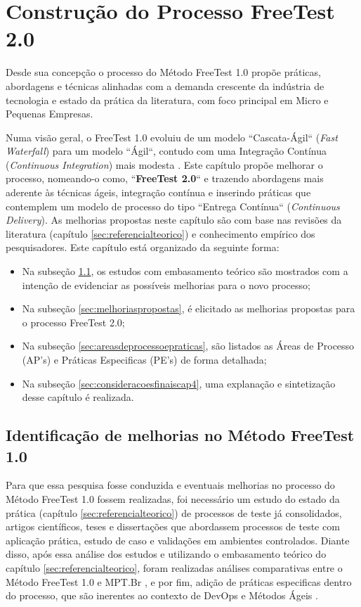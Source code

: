 \chapter{Construção do Processo FreeTest 2.0}
\label{sec:construcaoframeworkprocesso}

Desde sua concepção o processo do Método FreeTest 1.0 propõe práticas, abordagens e técnicas alinhadas com a demanda crescente da indústria de tecnologia e estado da prática da literatura, com foco principal em Micro e Pequenas Empresas. 

Numa visão geral, o FreeTest 1.0 evoluiu de um modelo “Cascata-Ágil“ (\textit{Fast Waterfall}) para um modelo “Ágil“, contudo com uma Integração Contínua (\textit{Continuous Integration}) mais modesta \cite{sauceLabes2017}. Este capítulo propõe melhorar o processo, nomeando-o como, “\textbf{FreeTest 2.0}“ e trazendo abordagens mais aderente às técnicas ágeis, integração contínua e inserindo práticas que contemplem um modelo de processo do tipo “Entrega Contínua“ (\textit{Continuous Delivery}). As melhorias propostas neste capítulo são com base nas revisões da literatura (capítulo \ref{sec:referencialteorico}) e conhecimento empírico dos pesquisadores. Este capítulo está organizado da seguinte forma:

\begin{itemize}
    \item Na subseção \ref{sec:identificacaomelhoriasfreetest}, os estudos com embasamento teórico são mostrados com a intenção de evidenciar as possíveis melhorias para o novo processo;
    \item Na subseção \ref{sec:melhoriaspropostas}, é elicitado as melhorias propostas para o processo FreeTest 2.0;
    \item Na subseção \ref{sec:areasdeprocessoepraticas}, são listados as Áreas de Processo (AP's) e Práticas Especificas (PE's) de forma detalhada;
    \item Na subseção \ref{sec:consideracoesfinaiscap4}, uma explanação e sintetização desse capítulo é realizada.
\end{itemize}

\section{Identificação de melhorias no Método FreeTest 1.0}
\label{sec:identificacaomelhoriasfreetest}

Para que essa pesquisa fosse conduzida e eventuais melhorias no processo do Método FreeTest 1.0 fossem realizadas, foi necessário um estudo do estado da prática (capítulo \ref{sec:referencialteorico}) de processos de teste já consolidados, artigos científicos, teses e dissertações que abordassem processos de teste com aplicação prática, estudo de caso e validações em ambientes controlados. Diante disso, após essa análise dos estudos e utilizando o embasamento teórico do capítulo \ref{sec:referencialteorico}, foram realizadas análises comparativas entre o Método FreeTest 1.0 e MPT.Br \cite{GuiaMPTbr}, e por fim, adição de práticas especificas dentro do processo, que são inerentes ao contexto de DevOps \cite{Debois2008} e Métodos Ágeis \cite{Beck2001}. 

